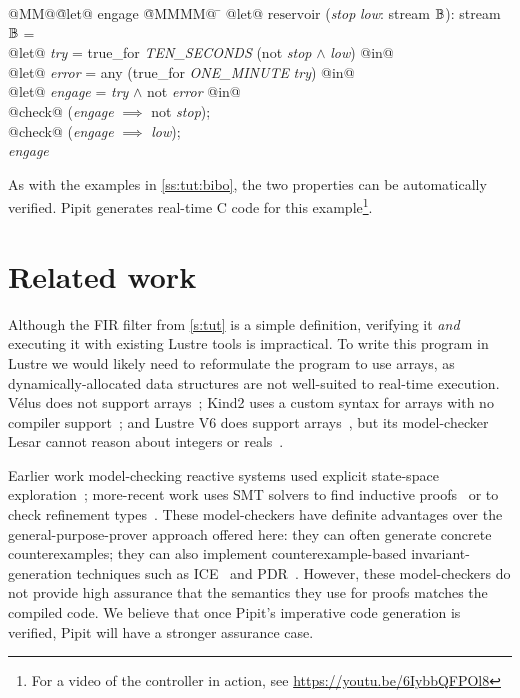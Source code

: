 \documentclass[sigplan,screen, review]{acmart}
\begin{document}
\newcommand\estop{\textit{stop}}
\newcommand\low{\textit{low}}
\newcommand\soltry{\textit{try}}
\newcommand\error{\textit{error}}
\newcommand\solen{\textit{engage}}
\begin{tabbing}
  @MM@\= @let@ engage \= @MMMM@ \= \kill
  @let@ $\mbox{reservoir}$ (\estop{} \low{}: stream $\mathbb{B}$): stream $\mathbb{B}$ = \\
  \> @let@ \soltry{} \> = true\_for \textit{TEN\_SECONDS} (not \estop{} $\wedge$ \low{}) @in@ \\
  \> @let@ \error{} \> = any (true\_for \textit{ONE\_MINUTE} \soltry{}) @in@ \\
  \> @let@ \solen{} \> = \soltry{} $\wedge$ not \error{} @in@ \\
  \> @check@ (\solen{} $\implies$ not \estop{}); \\
  \> @check@ (\solen{} $\implies$ \low{}); \\
  \> \solen{}
\end{tabbing}
\pagebreak

As with the examples in \autoref{ss:tut:bibo}, the two properties can be automatically verified.
Pipit generates real-time C code for this example\footnote{For a video of the controller in action, see \url{https://youtu.be/6IybbQFPOl8}}.

\section{Related work}
\label{s:related-work}

Although the FIR filter from \autoref{s:tut} is a simple definition, verifying it \emph{and} executing it with existing Lustre tools is impractical.
To write this program in Lustre we would likely need to reformulate the program to use arrays, as dynamically-allocated data structures are not well-suited to real-time execution.
Vélus does not support arrays~\cite{bourke2017formally}; Kind2 uses a custom syntax for arrays with no compiler support~\cite{champion2016kind2}; and Lustre V6 does support arrays~\cite{jahier2016lustre}, but its model-checker Lesar cannot reason about integers or reals~\cite{raymond2008synchronous}.

Earlier work model-checking reactive systems used explicit state-space exploration~\cite{raymond2008synchronous}; more-recent work uses SMT solvers to find inductive proofs~\cite{hagen2008scaling,champion2016kind2} or to check refinement types~\cite{chen2022synchronous}.
These model-checkers have definite advantages over the general-purpose-prover approach offered here: they can often generate concrete counterexamples; they can also implement counterexample-based invariant-generation techniques such as ICE~\cite{garg2014ice} and PDR~\cite{bradley2011sat,een2011efficient}.
However, these model-checkers do not provide high assurance that the semantics they use for proofs matches the compiled code.
We believe that once Pipit's imperative code generation is verified, Pipit will have a stronger assurance case.
\end{document}
